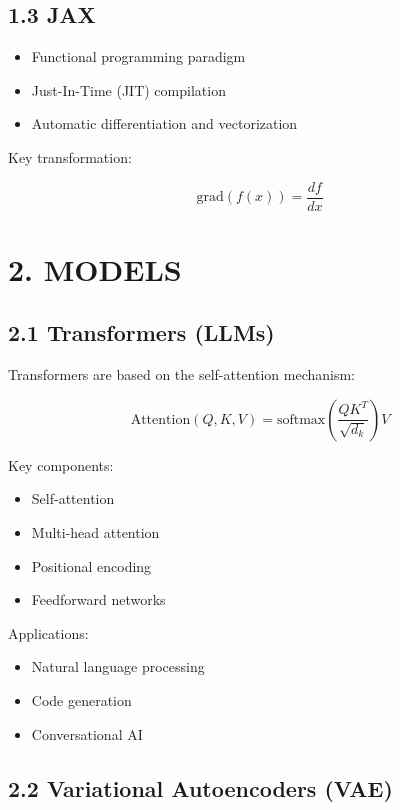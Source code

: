 \subsection*{1.3 JAX}

\begin{itemize}
\item Functional programming paradigm
\item Just-In-Time (JIT) compilation
\item Automatic differentiation and vectorization
\end{itemize}

Key transformation:

\[
\text{grad}(f(x)) = \frac{df}{dx}
\]

\vspace{0.5cm}

\section*{2. MODELS}

\subsection*{2.1 Transformers (LLMs)}

Transformers are based on the self-attention mechanism:

\[
\text{Attention}(Q,K,V) = \text{softmax}\left(\frac{QK^T}{\sqrt{d_k}}\right)V
\]

Key components:

\begin{itemize}
\item Self-attention
\item Multi-head attention
\item Positional encoding
\item Feedforward networks
\end{itemize}

Applications:

\begin{itemize}
\item Natural language processing
\item Code generation
\item Conversational AI
\end{itemize}

\vspace{0.3cm}

\subsection*{2.2 Variational Autoencoders (VAE)}

